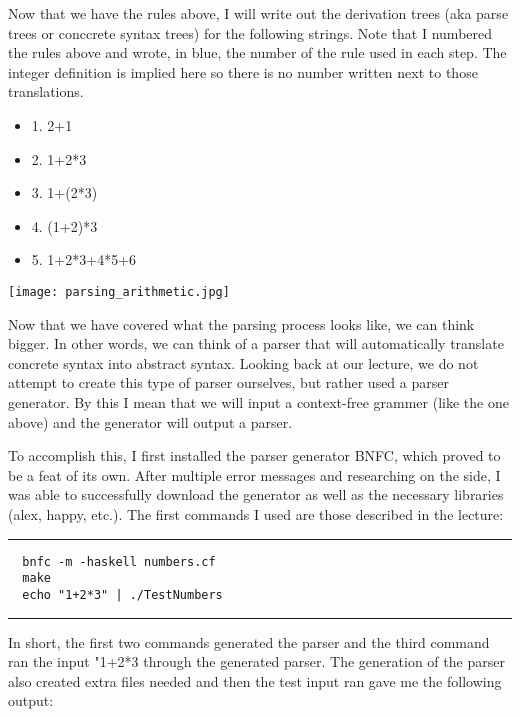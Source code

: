 \documentclass{article}
\theoremstyle{theorem}
\theoremstyle{definition}
\theoremstyle{remark}
\begin{document}
Now that we have the rules above, I will write out the derivation trees (aka parse trees or conccrete syntax trees) for the following strings. Note that I numbered the rules above and wrote, in blue, the number of the rule used in each step. The integer definition is implied here so there is no 
number written next to those translations. 
\begin{itemize}
  \item[\ding{99}] 1. 2+1
  \item[\ding{99}] 2. 1+2*3
  \item[\ding{99}] 3. 1+(2*3)
  \item[\ding{99}] 4. (1+2)*3
  \item[\ding{99}] 5. 1+2*3+4*5+6
\end{itemize}

\begin{center}
  \texttt{[image: parsing\_arithmetic.jpg]}
\end{center}

Now that we have covered what the parsing process looks like, we can think bigger. In other words, we can think of a parser that will automatically translate concrete syntax into abstract syntax. Looking back at our lecture, we do not attempt to create this type of parser ourselves, but rather 
used a parser generator. By this I mean that we will input a context-free grammer (like the one above) and the generator will output a parser.


To accomplish this, I first installed the parser generator BNFC, which proved to be a feat of its own. After multiple error messages and researching on the side, I was able to successfully download the generator as well as the necessary libraries (alex, happy, etc.). The first commands I used are those described in the 
lecture: 

\noindent
  {\color{gray} \rule{\linewidth}{0.05mm}}

\begin{verbatim}
  bnfc -m -haskell numbers.cf
  make
  echo "1+2*3" | ./TestNumbers
\end{verbatim}

\noindent
  {\color{gray} \rule{\linewidth}{0.05mm}}


In short, the first two commands generated the parser and the third command ran the input "1+2*3 through the generated parser. 
The generation of the parser also created extra files needed and then the test input ran gave me the following output: 
\end{document}
